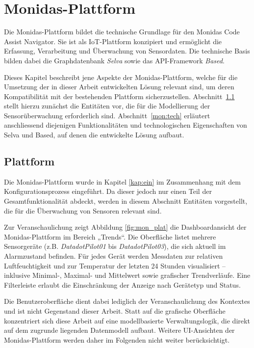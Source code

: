 \section{Monidas-Plattform}
\label{mon}

Die Monidas-Plattform bildet die technische Grundlage für den Monidas Code Assist Navigator. Sie ist als IoT-Plattform konzipiert und ermöglicht die Erfassung, Verarbeitung und Überwachung von Sensordaten. Die technische Basis bilden dabei die Graphdatenbank \textit{Selva} sowie das API-Framework \textit{Based}.

Dieses Kapitel beschreibt jene Aspekte der Monidas-Plattform, welche für die Umsetzung der in dieser Arbeit entwickelten Lösung relevant sind, um deren Kompatibilität mit der bestehenden Plattform sicherzustellen. Abschnitt~\ref{mon:plat} stellt hierzu zunächst die Entitäten vor, die für die Modellierung der Sensorüberwachung erforderlich sind. Abschnitt~\ref{mon:tech} erläutert anschliessend diejenigen Funktionalitäten und technologischen Eigenschaften von Selva und Based, auf denen die entwickelte Lösung aufbaut.

\subsection{Plattform}
\label{mon:plat}
Die Monidas-Plattform wurde in Kapitel \ref{kap:ein} im Zusammenhang mit dem Konfigurationsprozess eingeführt. Da dieser jedoch nur einen Teil der Gesamtfunktionalität abdeckt, werden in diesem Abschnitt Entitäten vorgestellt, die für die Überwachung von Sensoren relevant sind.

Zur Veranschaulichung zeigt Abbildung \ref{fig:mon_plat} die Dashboardansicht der Monidas-Plattform im Bereich „Trends“.  
Die Oberfläche listet mehrere Sensorgeräte (z.B. \textit{DatadotPilot01} bis \textit{DatadotPilot03}), die sich aktuell im Alarmzustand befinden. Für jedes Gerät werden Messdaten zur relativen Luftfeuchtigkeit und zur Temperatur der letzten 24 Stunden visualisiert – inklusive Minimal-, Maximal- und Mittelwert sowie grafischer Trendverläufe. Eine Filterleiste erlaubt die Einschränkung der Anzeige nach Gerätetyp und Status.

Die Benutzeroberfläche dient dabei lediglich der Veranschaulichung des Kontextes und ist nicht Gegenstand dieser Arbeit.  
Statt auf die grafische Oberfläche konzentriert sich diese Arbeit auf eine modellbasierte Verwaltungslogik, die direkt auf dem zugrunde liegenden Datenmodell aufbaut.  
Weitere UI-Ansichten der Monidas-Plattform werden daher im Folgenden nicht weiter berücksichtigt.

